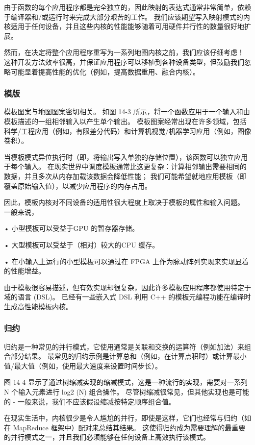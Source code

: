 由于函数的每个应用程序都是完全独立的，因此映射的表达式通常非常简单，依赖于编译器和/或运行时来完成大部分艰苦的工作。 我们应该期望写入映射模式的内核适用于任何设备，并且这些内核的性能能够随着可用硬件并行性的数量很好地扩展。

然而，在决定将整个应用程序重写为一系列地图内核之前，我们应该仔细考虑！ 这种开发方法效率很高，并保证应用程序可以移植到各种设备类型，但鼓励我们忽略可能显着提高性能的优化（例如，提高数据重用、融合内核）。

\subsubsection{模版}
模板图案与地图图案密切相关。 如图 14-3 所示，将一个函数应用于一个输入和由模板描述的一组相邻输入以产生单个输出。 模板图案经常出现在许多领域，包括科学/工程应用（例如，有限差分代码）和计算机视觉/机器学习应用（例如，图像卷积）。

当模板模式异位执行时（即，将输出写入单独的存储位置），该函数可以独立应用于每个输入。 在现实世界中调度模板通常比这更复杂：计算相邻输出需要相同的数据，并且多次从内存加载该数据会降低性能； 我们可能希望就地应用模板（即覆盖原始输入值），以减少应用程序的内存占用。

因此，模板内核对不同设备的适用性很大程度上取决于模板的属性和输入问题。 一般来说，

• 小型模板可以受益于GPU 的暂存器存储。

• 大型模板可以受益于（相对）较大的CPU 缓存。

• 在小输入上运行的小型模板可以通过在 FPGA 上作为脉动阵列实现来实现显着的性能增益。

由于模板很容易描述，但有效实现却很复杂，因此许多模板应用程序都使用特定于域的语言 (DSL)。 已经有一些嵌入式 DSL 利用 C++ 的模板元编程功能在编译时生成高性能模板内核。

\subsubsection{归约}
归约是一种常见的并行模式，它使用通常是关联和交换的运算符（例如加法）来组合部分结果。 最常见的归约示例是计算总和（例如，在计算点积时）或计算最小值/最大值（例如，使用最大速度来设置时间步长）。

图 14-4 显示了通过树缩减实现的缩减模式，这是一种流行的实现，需要对一系列 N 个输入元素进行 log2 (N) 组合操作。 尽管树缩减很常见，但其他实现也是可能的 - 一般来说，我们不应该假设缩减按特定顺序组合值。

在现实生活中，内核很少是令人尴尬的并行，即使是这样，它们也经常与归约（如在 MapReduce 框架中）配对来总结其结果。 这使得归约成为需要理解的最重要的并行模式之一，并且我们必须能够在任何设备上高效执行该模式。

